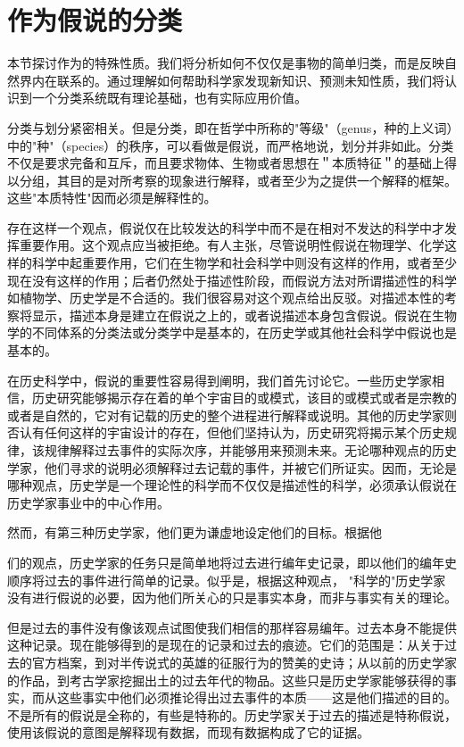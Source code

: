 \section{作为假说的分类}

\begin{logicbox}[title=引言]
本节探讨作为的特殊性质。我们将分析如何不仅仅是事物的简单归类，而是反映自然界内在联系的。通过理解如何帮助科学家发现新知识、预测未知性质，我们将认识到一个分类系统既有理论基础，也有实际应用价值。
\end{logicbox}

分类与划分紧密相关。但是分类，即在哲学中所称的"等级"（genus，种的上义词）中的"种"（species）的秩序，可以看做是假说，而严格地说，划分并非如此。分类不仅是要求完备和互斥，而且要求物体、生物或者思想在＂本质特征＂的基础上得以分组，其目的是对所考察的现象进行解释，或者至少为之提供一个解释的框架。这些"本质特性"因而必须是解释性的。

存在这样一个观点，假说仅在比较发达的科学中而不是在相对不发达的科学中才发挥重要作用。这个观点应当被拒绝。有人主张，尽管说明性假说在物理学、化学这样的科学中起重要作用，它们在生物学和社会科学中则没有这样的作用，或者至少现在没有这样的作用；后者仍然处于描述性阶段，而假说方法对所谓描述性的科学如植物学、历史学是不合适的。我们很容易对这个观点给出反驳。对描述本性的考察将显示，描述本身是建立在假说之上的，或者说描述本身包含假说。假说在生物学的不同体系的分类法或分类学中是基本的，在历史学或其他社会科学中假说也是基本的。

在历史科学中，假说的重要性容易得到阐明，我们首先讨论它。一些历史学家相信，历史研究能够揭示存在着的单个宇宙目的或模式，该目的或模式或者是宗教的或者是自然的，它对有记载的历史的整个进程进行解释或说明。其他的历史学家则否认有任何这样的宇宙设计的存在，但他们坚持认为，历史研究将揭示某个历史规律，该规律解释过去事件的实际次序，并能够用来预测未来。无论哪种观点的历史学家，他们寻求的说明必须解释过去记载的事件，并被它们所证实。因而，无论是哪种观点，历史学是一个理论性的科学而不仅仅是描述性的科学，必须承认假说在历史学家事业中的中心作用。

然而，有第三种历史学家，他们更为谦虚地设定他们的目标。根据他

们的观点，历史学家的任务只是简单地将过去进行编年史记录，即以他们的编年史顺序将过去的事件进行简单的记录。似乎是，根据这种观点， "科学的"历史学家没有进行假说的必要，因为他们所关心的只是事实本身，而非与事实有关的理论。

但是过去的事件没有像该观点试图使我们相信的那样容易编年。过去本身不能提供这种记录。现在能够得到的是现在的记录和过去的痕迹。它们的范围是：从关于过去的官方档案，到对半传说式的英雄的征服行为的赞美的史诗；从以前的历史学家的作品，到考古学家挖掘出土的过去年代的物品。这些只是历史学家能够获得的事实，而从这些事实中他们必须推论得出过去事件的本质——这是他们描述的目的。不是所有的假说是全称的，有些是特称的。历史学家关于过去的描述是特称假说，使用该假说的意图是解释现有数据，而现有数据构成了它的证据。

